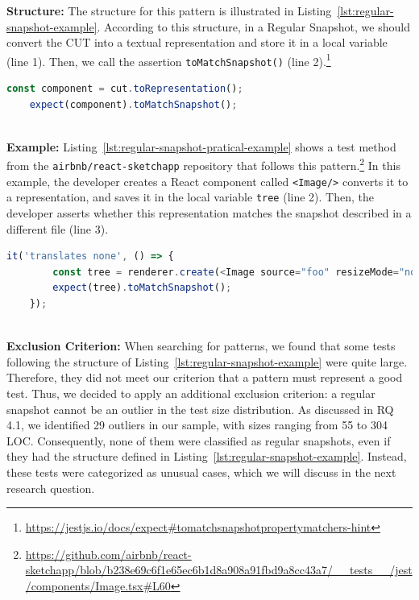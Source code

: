 \documentclass[
	msc, %
	english %
]{../ppgccufmg}
\begin{document}
        \noindent\textbf{Structure:} The structure for this pattern is illustrated in Listing~\ref{lst:regular-snapshot-example}. According to this structure, in a Regular Snapshot, we should convert the CUT into a textual representation and store it in a local variable (line 1). Then, we call the assertion \texttt{toMatchSnapshot()} (line 2).\footnote{\url{https://jestjs.io/docs/expect\#tomatchsnapshotpropertymatchers-hint}}\\

        \begin{lstlisting}[language=javascript, caption= Regular snapshot pattern, label=lst:regular-snapshot-example]
    const component = cut.toRepresentation();
    expect(component).toMatchSnapshot();
        \end{lstlisting} 
        ~\\[-2.0pt]

        \noindent\textbf{Example:} Listing~\ref{lst:regular-snapshot-pratical-example} shows a test method from the \texttt{airbnb/react-sketchapp} repository that follows this pattern.\footnote{\url{https://github.com/airbnb/react-sketchapp/blob/b238e69c6f1e65ec6b1d8a908a91fbd9a8cc43a7/__tests__/jest/components/Image.tsx\#L60}}
        In this example, the developer creates a React component called \texttt{<Image/>} converts it to a representation, and saves it in the local variable \texttt{tree} (line 2). Then, the developer asserts whether this representation matches the snapshot described in a different file (line 3).\\

        \begin{lstlisting}[language=javascript, caption= Regular snapshot test in \texttt{airbnb/react-sketchapp}, label=lst:regular-snapshot-pratical-example]
    it('translates none', () => {
        const tree = renderer.create(<Image source="foo" resizeMode="none" />).toJSON();
        expect(tree).toMatchSnapshot();
    });
        \end{lstlisting}
        ~\\[-2.0pt]

        \noindent\textbf{Exclusion Criterion:} 
        When searching for patterns, we found that some tests following the structure of Listing~\ref{lst:regular-snapshot-example} were quite large. Therefore, they did not meet our criterion that a pattern must represent a good test. Thus, we decided to apply an additional exclusion criterion: a regular snapshot cannot be an outlier in the test size distribution. As discussed in RQ 4.1, we identified 29 outliers in our sample, with sizes ranging from 55 to 304 LOC. Consequently, none of them were classified as regular snapshots, even if they had the structure defined in Listing~\ref{lst:regular-snapshot-example}. Instead, these tests were categorized as unusual cases, which we will discuss in the next research question.
\end{document}
